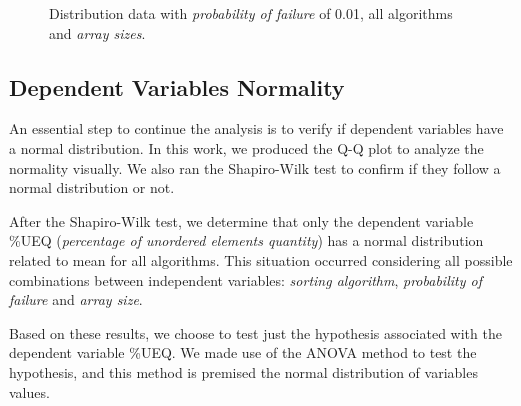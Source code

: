 \begin{figure}[H]
    \centering
    \caption{Distribution data with \textit{probability of failure} of 0.01, all algorithms and \textit{array sizes}.}
    \label{fig-distribution-all-algorithms-001-all-sizes}
\end{figure}

\subsection{Dependent Variables Normality}

An essential step to continue the analysis is to verify if dependent variables have a normal distribution. In this work, we produced the Q-Q plot to analyze the normality visually. We also ran the Shapiro-Wilk \cite{shapiro1965analysis} test to confirm if they follow a normal distribution or not.

After the Shapiro-Wilk test, we determine that only the dependent variable \%UEQ (\textit{percentage of unordered elements quantity}) has a normal distribution related to mean for all algorithms. This situation occurred considering all possible combinations between independent variables: \textit{sorting algorithm}, \textit{probability of failure} and \textit{array size}.

Based on these results, we choose to test just the hypothesis associated with the dependent variable \%UEQ. We made use of the ANOVA method to test the hypothesis, and this method is premised the normal distribution of variables values.


